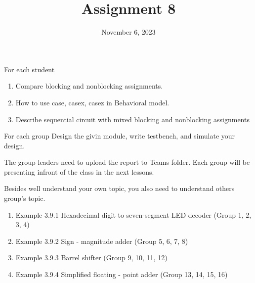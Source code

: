 \documentclass{vhdl-assignment}
\title{Assignment 8}
\date{November 6, 2023}
\begin{document}
\maketitle
\thispagestyle{fancy}

\begin{problem}{For each student}
    \begin{enumerate}
        \item Compare blocking and nonblocking assignments.
        \item How to use case, casex, casez in Behavioral model.
        \item Describe sequential circuit with mixed blocking and nonblocking assignments
    \end{enumerate}

\end{problem}

\begin{problem}{For each group}
    Design the givin module, write testbench, and simulate your design.

    The group leaders need to upload the report to Teams folder. Each group will be presenting infront of the class in the next lessons.

    Besides well understand your own topic, you also need to understand others group's topic.
    
    \begin{enumerate}
        \item Example 3.9.1 Hexadecimal digit to seven-segment LED decoder (Group 1, 2, 3, 4)
        \item Example 3.9.2 Sign - magnitude adder (Group 5, 6, 7, 8)
        \item Example 3.9.3 Barrel shifter (Group 9, 10, 11, 12)
        \item Example 3.9.4 Simplified floating - point adder (Group 13, 14, 15, 16)
    \end{enumerate}


\end{problem}
\end{document}
